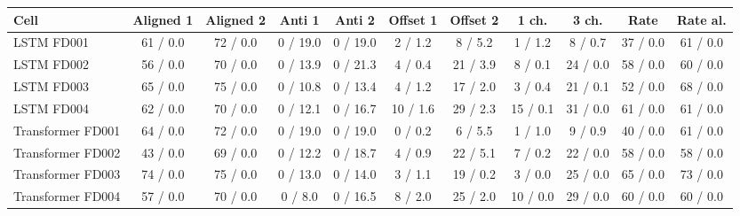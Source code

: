\begin{tabular}{lcccccccccc}\toprule
Cell & Aligned 1 & Aligned 2 & Anti 1 & Anti 2 & Offset 1 & Offset 2 & 1 ch. & 3 ch. & Rate & Rate al. \\ \midrule
LSTM FD001 & 61 / 0.0 & 72 / 0.0 & 0 / 19.0 & 0 / 19.0 & 2 / 1.2 & 8 / 5.2 & 1 / 1.2 & 8 / 0.7 & 37 / 0.0 & 61 / 0.0 \\
LSTM FD002 & 56 / 0.0 & 70 / 0.0 & 0 / 13.9 & 0 / 21.3 & 4 / 0.4 & 21 / 3.9 & 8 / 0.1 & 24 / 0.0 & 58 / 0.0 & 60 / 0.0 \\
LSTM FD003 & 65 / 0.0 & 75 / 0.0 & 0 / 10.8 & 0 / 13.4 & 4 / 1.2 & 17 / 2.0 & 3 / 0.4 & 21 / 0.1 & 52 / 0.0 & 68 / 0.0 \\
LSTM FD004 & 62 / 0.0 & 70 / 0.0 & 0 / 12.1 & 0 / 16.7 & 10 / 1.6 & 29 / 2.3 & 15 / 0.1 & 31 / 0.0 & 61 / 0.0 & 61 / 0.0 \\
\midrule
Transformer FD001 & 64 / 0.0 & 72 / 0.0 & 0 / 19.0 & 0 / 19.0 & 0 / 0.2 & 6 / 5.5 & 1 / 1.0 & 9 / 0.9 & 40 / 0.0 & 61 / 0.0 \\
Transformer FD002 & 43 / 0.0 & 69 / 0.0 & 0 / 12.2 & 0 / 18.7 & 4 / 0.9 & 22 / 5.1 & 7 / 0.2 & 22 / 0.0 & 58 / 0.0 & 58 / 0.0 \\
Transformer FD003 & 74 / 0.0 & 75 / 0.0 & 0 / 13.0 & 0 / 14.0 & 3 / 1.1 & 19 / 0.2 & 3 / 0.0 & 25 / 0.0 & 65 / 0.0 & 73 / 0.0 \\
Transformer FD004 & 57 / 0.0 & 70 / 0.0 & 0 / 8.0 & 0 / 16.5 & 8 / 2.0 & 25 / 2.0 & 10 / 0.0 & 29 / 0.0 & 60 / 0.0 & 60 / 0.0 \\
\bottomrule\end{tabular}
